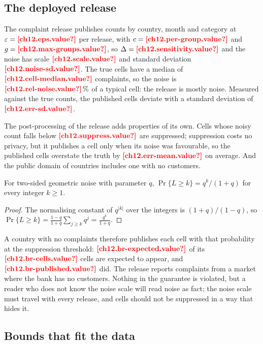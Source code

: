 \subsection{The deployed release}

The complaint release publishes counts by country, month and category at $\varepsilon = \est{ch12.eps}{value}$ per
release, with $c = \est{ch12.per-group}{value}$ and $g = \est{ch12.max-groups}{value}$, so $\Delta = \est{ch12.sensitivity}{value}$
and the noise has scale $\est{ch12.scale}{value}$ and standard deviation $\est{ch12.noise-sd}{value}$. The true cells have a
median of $\est{ch12.cell-median}{value}$ complaints, so the noise is $\est{ch12.rel-noise}{value}\,\%$ of a typical cell: the
release is mostly noise. Measured against the true counts, the published cells deviate with a standard deviation of
$\est{ch12.err-sd}{value}$.

The post-processing of the release adds properties of its own. Cells whose noisy count falls below
$\est{ch12.suppress}{value}$ are suppressed; suppression costs no privacy, but it publishes a cell only when its noise was
favourable, so the published cells overstate the truth by $\est{ch12.err-mean}{value}$ on average. And the public domain of
countries includes one with no customers.

\begin{proposition}\label{prop:gp-tail}
For two-sided geometric noise with parameter $q$, $\Pr\{L \ge k\} = q^{k} / (1 + q)$ for every integer $k \ge 1$.
\end{proposition}

\begin{proof}
The normalising constant of $q^{\lvert k \rvert}$ over the integers is $(1 + q)/(1 - q)$, so
$\Pr\{L \ge k\} = \frac{1 - q}{1 + q} \sum_{j \ge k} q^{j} = \frac{q^{k}}{1 + q}$.
\end{proof}

A country with no complaints therefore publishes each cell with that probability at the suppression threshold:
$\est{ch12.br-expected}{value}$ of its $\est{ch12.br-cells}{value}$ cells are expected to appear, and
$\est{ch12.br-published}{value}$ did. The release reports complaints from a market where the bank has no customers. Nothing
in the guarantee is violated, but a reader who does not know the noise scale will read noise as fact; the noise scale must
travel with every release, and cells should not be suppressed in a way that hides it.

\subsection{Bounds that fit the data}


